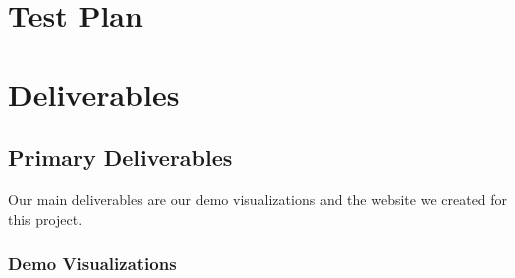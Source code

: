 \documentclass[paper=a4, fontsize=11pt]{report} %
\begin{document}


\chapter{Test Plan} %
\label{cha:test_plan}





\chapter{Deliverables} %
\label{cha:deliverables}

\section{Primary Deliverables} %
\label{sec:primary_deliverables}

Our main deliverables are our demo visualizations and the website we created for this project.

\subsection{Demo Visualizations} %
\label{sub:demo_visualizations}
\end{document}
